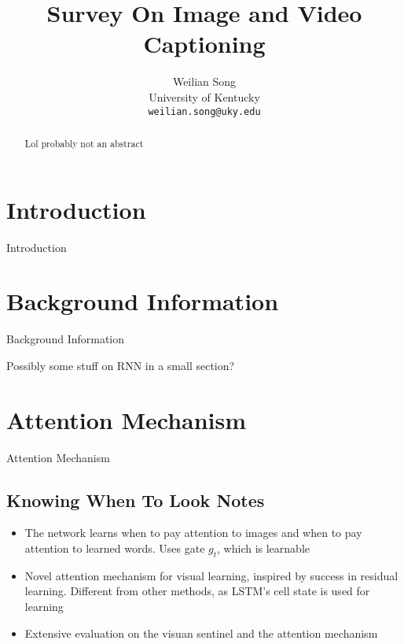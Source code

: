 \documentclass[10pt,twocolumn,letterpaper]{article}
\begin{document}
\title{Survey On Image and Video Captioning}

\author{Weilian Song\\
University of Kentucky\\
{\tt\small weilian.song@uky.edu}
}

\maketitle

\begin{abstract}
  Lol probably not an abstract
\end{abstract}

\section{Introduction}

Introduction

\section{Background Information}

Background Information

Possibly some stuff on RNN in a small section?

\section{Attention Mechanism}

Attention Mechanism

\subsection{Knowing When To Look Notes}

\begin{itemize}
  \item The network learns when to pay attention to images and when to pay
        attention to learned words. Uses gate $g_t$, which is learnable
  \item Novel attention mechanism for visual learning, inspired by success in
        residual learning. Different from other methods, as LSTM's cell state
        is used for learning
  \item Extensive evaluation on the visuan sentinel and the attention mechanism
\end{itemize}
\end{document}
